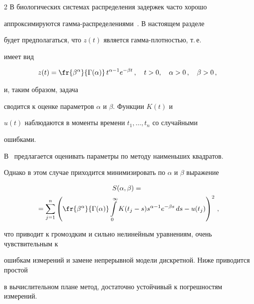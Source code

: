 \begin{multicols}{2}
В биологических системах распределения задержек часто хорошо


аппроксимируются гамма-рас\-пре\-де\-ле\-ниями~\cite{6us}. В настоящем разделе


будет предполагаться, что $z(t)$ является гамма-плот\-ностью, т.\,е.\


имеет вид


$$


z(t)=\fr{\beta^\alpha}{\Gamma(\alpha)}\,t^{\alpha-1}e^{-\beta t}\,,\quad 


t>0,\quad \alpha>0\,,\quad \beta>0\,,


$$ 


и, таким образом, задача


сводится к оценке параметров $\alpha$ и $\beta$. Функции $K(t)$ и


$u(t)$ наблюдаются в  моменты времени $t_1,\ldots ,t_n$ со случайными


ошибками.





В~\cite{4us} предлагается оценивать параметры по методу наименьших квадратов.


Однако в этом случае приходится минимизировать по $\alpha$ и $\beta$ выражение


\begin{multline*}


S(\alpha,\beta)={}\\


{}=\sum_{j=1}^n


\left(


\fr{\beta^\alpha}{\Gamma(\alpha)}


\int\limits_0^\infty K(t_j-s)s^{\alpha-1}e^{-\beta s}\,ds-u(t_j)


\right)^2\,,


\end{multline*}


что приводит к громоздким и сильно нелинейным уравнениям, очень чувствительным к


ошибкам измерений и замене непрерывной модели дискретной. Ниже приводится простой


в вычислительном плане метод, достаточно устойчивый к погрешностям измерений.


\begin{table}\small


\begin{center}


\end{center}
\end{table}
\end{multicols}
